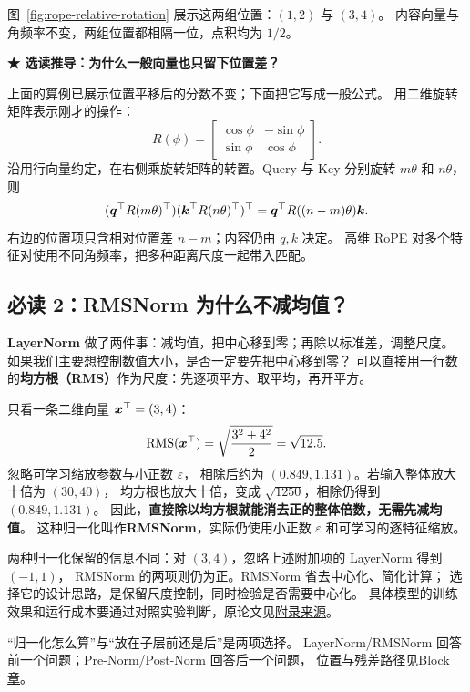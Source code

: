图~\ref{fig:rope-relative-rotation} 展示这两组位置：$(1,2)$ 与 $(3,4)$。
内容向量与角频率不变，两组位置都相隔一位，点积均为 $1/2$。


\noindent\textbf{\texorpdfstring{{\symboliconfont ★}}{★} 选读推导：为什么一般向量也只留下位置差？}\par
上面的算例已展示位置平移后的分数不变；下面把它写成一般公式。
用二维旋转矩阵表示刚才的操作：
\[
R(\phi)=\begin{bmatrix}\cos\phi&-\sin\phi\\\sin\phi&\cos\phi\end{bmatrix}.
\]
沿用行向量约定，在右侧乘旋转矩阵的转置。Query 与 Key 分别旋转 $m\theta$ 和 $n\theta$，则
\begin{equation}
(\boldsymbol{q}^\top R(m\theta)^\top)
(\boldsymbol{k}^\top R(n\theta)^\top)^\top
=\boldsymbol{q}^\top R((n-m)\theta)\boldsymbol{k}.
\label{eq:rope-relative}
\end{equation}
右边的位置项只含相对位置差 $n-m$；内容仍由 $q,k$ 决定。
高维 RoPE 对多个特征对使用不同角频率，把多种距离尺度一起带入匹配。

\subsection{必读 2：RMSNorm 为什么不减均值？}
\label{sec:modern-rmsnorm}
\label{concept:rmsnorm}

\textbf{LayerNorm} 做了两件事：减均值，把中心移到零；再除以标准差，调整尺度。
如果我们主要想控制数值大小，是否一定要先把中心移到零？
可以直接用一行数的\textbf{均方根（RMS）}作为尺度：先逐项平方、取平均，再开平方。

只看一条二维向量 $\boldsymbol{x}^\top=(3,4)$：
\[
\operatorname{RMS}(\boldsymbol{x}^\top)
=\sqrt{\frac{3^2+4^2}{2}}=\sqrt{12.5}.
\]
忽略可学习缩放参数与小正数 $\varepsilon$，
相除后约为 $(0.849,1.131)$。若输入整体放大十倍为 $(30,40)$，
均方根也放大十倍，变成 $\sqrt{1250}$，相除仍得到 $(0.849,1.131)$。
因此，\textbf{直接除以均方根就能消去正的整体倍数，无需先减均值}。
这种归一化叫作\textbf{RMSNorm}，实际仍使用小正数 $\varepsilon$ 和可学习的逐特征缩放。

两种归一化保留的信息不同：对 $(3,4)$，忽略上述附加项的 LayerNorm 得到 $(-1,1)$，
RMSNorm 的两项则仍为正。RMSNorm 省去中心化、简化计算；
选择它的设计思路，是保留尺度控制，同时检验是否需要中心化。
具体模型的训练效果和运行成本要通过对照实验判断，原论文见\hyperref[source:rmsnorm]{附录来源}。


“归一化怎么算”与“放在子层前还是后”是两项选择。
LayerNorm/RMSNorm 回答前一个问题；Pre-Norm/Post-Norm 回答后一个问题，
位置与残差路径见\hyperref[intro:transformer-architecture]{Block 章}。

